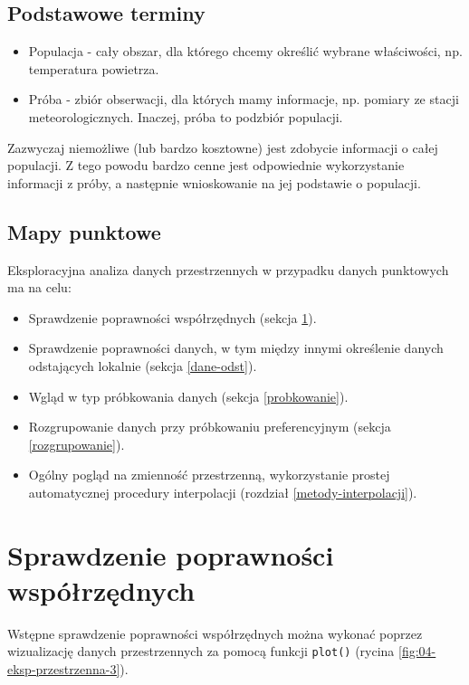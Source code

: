 \documentclass[
  paper=6in:9in,pagesize=pdftex,headinclude=on,footinclude=on,10pt]{scrbook}
\providecommand{\tightlist}{%
  \setlength{\itemsep}{0pt}\setlength{\parskip}{0pt}}
\begin{document}
\subsection{Podstawowe terminy}\label{podstawowe-terminy}

\begin{itemize}
\tightlist
\item
  Populacja - cały obszar, dla którego chcemy określić wybrane właściwości, np. temperatura powietrza.
\item
  Próba - zbiór obserwacji, dla których mamy informacje, np. pomiary ze stacji meteorologicznych.
  Inaczej, próba to podzbiór populacji.
\end{itemize}

Zazwyczaj niemożliwe (lub bardzo kosztowne) jest zdobycie informacji o całej populacji.
Z tego powodu bardzo cenne jest odpowiednie wykorzystanie informacji z próby, a następnie wnioskowanie na jej podstawie o populacji.

\subsection{Mapy punktowe}\label{mapy-punktowe}

Eksploracyjna analiza danych przestrzennych w przypadku danych punktowych ma na celu:

\begin{itemize}
\tightlist
\item
  Sprawdzenie poprawności współrzędnych (sekcja \ref{popr-wsp}).
\item
  Sprawdzenie poprawności danych, w tym między innymi określenie danych odstających lokalnie (sekcja \ref{dane-odst}).
\item
  Wgląd w typ próbkowania danych (sekcja \ref{probkowanie}).
\item
  Rozgrupowanie danych przy próbkowaniu preferencyjnym (sekcja \ref{rozgrupowanie}).
\item
  Ogólny pogląd na zmienność przestrzenną, wykorzystanie prostej automatycznej procedury interpolacji (rozdział \ref{metody-interpolacji}).
\end{itemize}

\section{Sprawdzenie poprawności współrzędnych}\label{popr-wsp}

Wstępne sprawdzenie poprawności współrzędnych można wykonać poprzez wizualizację danych przestrzennych za pomocą funkcji \texttt{plot()} (rycina \ref{fig:04-eksp-przestrzenna-3}).
\end{document}
